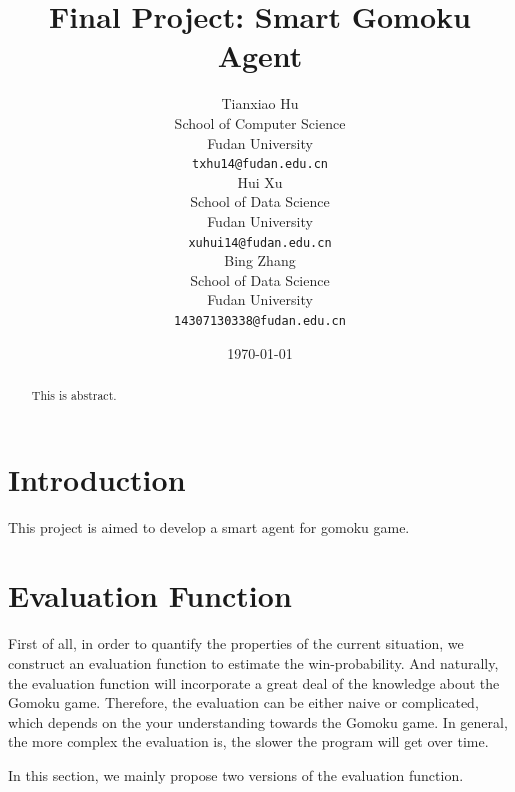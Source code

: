 \documentclass[11pt,a4paper]{article}
\title{Final Project: Smart Gomoku Agent}
\author{Tianxiao Hu \\
  School of Computer Science\\
  Fudan University\\
  {\tt txhu14@fudan.edu.cn} \\\And
  Hui Xu \\
  School of Data Science\\
  Fudan University\\
  {\tt xuhui14@fudan.edu.cn} \\\And
  Bing Zhang \\
  School of Data Science\\
  Fudan University\\
  {\tt 14307130338@fudan.edu.cn}
}
\date{\today}
\begin{document}
\maketitle
\begin{abstract}
  This is abstract.
\end{abstract}

\section{Introduction}

This project is aimed to develop a smart agent for gomoku game.

\section{Evaluation Function}
First of all, in order to quantify the properties of the current situation, we construct an evaluation function to estimate the win-probability. And naturally, the evaluation function will incorporate a great deal of the knowledge about the Gomoku game. Therefore, the evaluation can be either naive or complicated, which depends on the your understanding towards the Gomoku game. In general, the more complex the evaluation is, the slower the program will get over time.

In this section, we mainly propose two versions of the evaluation function.
\end{document}
